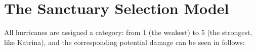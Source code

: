\documentclass{mcmthesis}	%
\begin{document}
\begin{center}
\begin{longtable}{p{}p{}m{}}

\end{longtable}
\end{center}%


\section{The Sanctuary Selection Model}
All hurricanes are assigned a category: from 1 (the weakest) to 5 (the strongest, like Katrina), and the corresponding potential damage can be seen in  follows:
\end{document}
